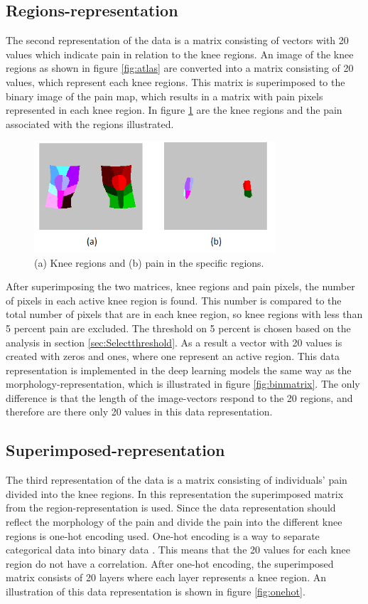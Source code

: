\subsection{Regions-representation}
The second representation of the data is a matrix consisting of vectors with 20 values which indicate pain in relation to the knee regions.
An image of the knee regions as shown in figure \ref{fig:atlas} are converted into a matrix consisting of 20 values, which represent each knee regions. This matrix is superimposed to the binary image of the pain map, which results in a matrix with pain pixels represented in each knee region. In figure \ref{fig:binregions} are the knee regions and the pain associated with the regions illustrated.

\begin{figure} [H]
\centering
\includegraphics[width=0.8\textwidth]{figures/binregions}
\caption{(a) Knee regions and (b) pain in the specific regions.}
\label{fig:binregions}
\end{figure}

\noindent
After superimposing the two matrices, knee regions and pain pixels, the number of pixels in each active knee region is found. This number is compared to the total number of pixels that are in each knee region, so knee regions with less than 5 percent pain are excluded. The threshold on 5 percent is chosen based on the analysis in section \ref{sec:Selectthreshold}. As a result a vector with 20 values is created with zeros and ones, where one represent an active region. This data representation is implemented in the deep learning models the same way as the morphology-representation, which is illustrated in figure \ref{fig:binmatrix}. The only difference is that the length of the image-vectors respond to the 20 regions, and therefore are there only 20 values in this data representation.


\subsection{Superimposed-representation}
The third representation of the data is a matrix consisting of individuals’ pain divided into the knee regions.
\noindent
In this representation the superimposed matrix from the region-representation is used. Since the data representation should reflect the morphology of the pain and divide the pain into the different knee regions is one-hot encoding used. One-hot encoding is a way to separate categorical data into binary data \citep{Harris2012}. This means that the 20 values for each knee region do not have a correlation. After one-hot encoding, the superimposed matrix consists of 20 layers where each layer represents a knee region. An illustration of this data representation is shown in figure \ref{fig:onehot}.


